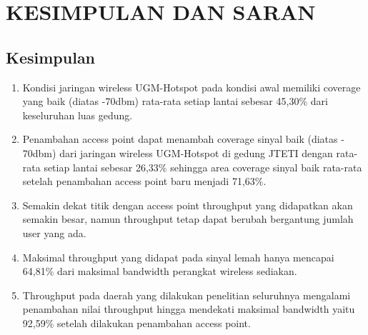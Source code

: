 
\chapter{KESIMPULAN DAN SARAN}

\section{Kesimpulan}
	\begin{enumerate}
		\item
		Kondisi jaringan wireless UGM-Hotspot pada kondisi awal memiliki coverage yang baik (diatas -70dbm) rata-rata setiap lantai sebesar 45,30\% dari keseluruhan luas gedung.
		\item
		Penambahan access point dapat menambah coverage sinyal baik (diatas - 70dbm) dari jaringan wireless UGM-Hotspot di gedung JTETI dengan rata-rata setiap lantai sebesar 26,33\% sehingga area coverage sinyal baik rata-rata setelah penambahan access point baru menjadi 71,63\%.
		\item
		Semakin dekat titik dengan access point throughput yang didapatkan akan semakin besar, namun throughput tetap dapat berubah bergantung jumlah user yang ada.
		\item
		Maksimal throughput yang didapat pada sinyal lemah hanya mencapai 64,81\% dari maksimal bandwidth perangkat wireless sediakan.
		\item
		Throughput pada daerah yang dilakukan penelitian seluruhnya mengalami penambahan nilai throughput hingga mendekati maksimal bandwidth yaitu 92,59\% setelah dilakukan penambahan access point.
	\end{enumerate}


